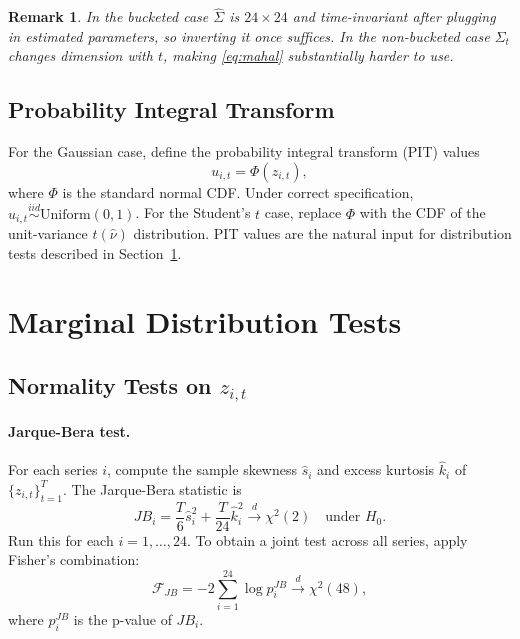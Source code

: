 \documentclass[12pt]{article}
\newtheorem{remark}{Remark}
\begin{document}
\begin{remark}
    In the bucketed case $\hat{\Sigma}$ is $24 \times 24$ and time-invariant after
    plugging in estimated parameters, so inverting it once suffices. In the non-bucketed
    case $\Sigma_t$ changes dimension with $t$, making \eqref{eq:mahal} substantially
    harder to use.
\end{remark}

\subsection{Probability Integral Transform}

For the Gaussian case, define the probability integral transform (PIT) values
\begin{equation}
    u_{i,t} = \Phi(z_{i,t}),
    \label{eq:pit}
\end{equation}
where $\Phi$ is the standard normal CDF. Under correct specification,
$u_{i,t} \overset{iid}{\sim} \mathrm{Uniform}(0,1)$. For the Student's $t$ case, replace
$\Phi$ with the CDF of the unit-variance $t(\hat{\nu})$ distribution. PIT values are the
natural input for distribution tests described in Section~\ref{sec:marginal}.

\section{Marginal Distribution Tests}
\label{sec:marginal}

\subsection{Normality Tests on $z_{i,t}$}

\paragraph{Jarque-Bera test.}
For each series $i$, compute the sample skewness $\hat{s}_i$ and excess kurtosis $\hat{k}_i$
of $\{z_{i,t}\}_{t=1}^T$. The Jarque-Bera statistic is
\begin{equation}
    JB_i = \frac{T}{6}\hat{s}_i^2 + \frac{T}{24}\hat{k}_i^2
    \overset{d}{\to} \chi^2(2) \quad \text{under } H_0.
\end{equation}
Run this for each $i = 1,\ldots,24$. To obtain a joint test across all series, apply
Fisher's combination:
\begin{equation}
    \mathcal{F}_{JB} = -2\sum_{i=1}^{24} \log p_i^{JB}
    \overset{d}{\to} \chi^2(48),
\end{equation}
where $p_i^{JB}$ is the p-value of $JB_i$.
\end{document}
